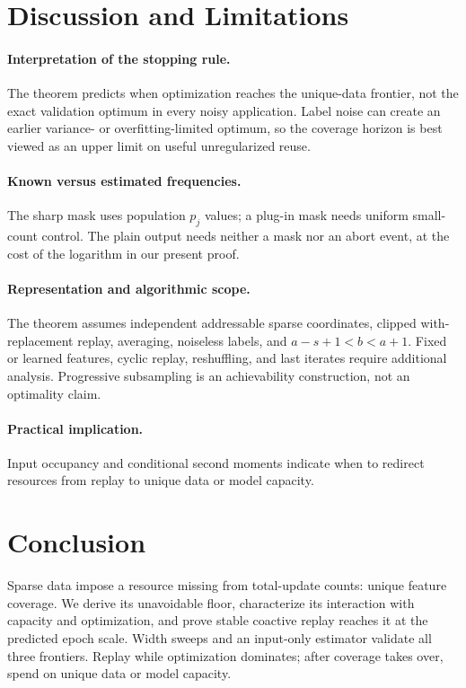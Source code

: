 \section{Discussion and Limitations}

\paragraph{Interpretation of the stopping rule.}
The theorem predicts when optimization reaches the unique-data frontier, not
the exact validation optimum in every noisy application. Label noise can create
an earlier variance- or overfitting-limited optimum, so the coverage horizon is
best viewed as an upper limit on useful unregularized reuse.

\paragraph{Known versus estimated frequencies.}
The sharp mask uses population $p_j$ values; a plug-in mask needs uniform
small-count control. The plain output needs neither a mask nor an abort event,
at the cost of the logarithm in our present proof.

\paragraph{Representation and algorithmic scope.}
The theorem assumes independent addressable sparse coordinates, clipped
with-replacement replay, averaging, noiseless labels, and
$a-s+1<b<a+1$. Fixed or learned features, cyclic replay, reshuffling, and last
iterates require additional analysis. Progressive subsampling is an
achievability construction, not an optimality claim.

\paragraph{Practical implication.}
Input occupancy and conditional second moments indicate when to redirect
resources from replay to unique data or model capacity.

\section{Conclusion}

Sparse data impose a resource missing from total-update counts: unique feature
coverage. We derive its unavoidable floor, characterize its interaction with
capacity and optimization, and prove stable coactive replay reaches it at the
predicted epoch scale. Width sweeps and an input-only estimator validate all
three frontiers. Replay while optimization dominates; after coverage takes over,
spend on unique data or model capacity.

